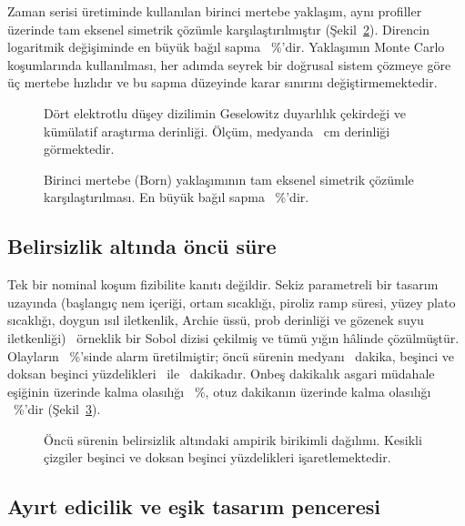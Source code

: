 \documentclass[11pt,a4paper]{article}
\begin{document}
Zaman serisi üretiminde kullanılan birinci mertebe yaklaşım, aynı profiller
üzerinde tam eksenel simetrik çözümle karşılaştırılmıştır
(Şekil~\ref{fig:born}). Direncin logaritmik değişiminde en büyük bağıl sapma
\bornErr~\%'dir. Yaklaşımın Monte Carlo koşumlarında kullanılması, her adımda
seyrek bir doğrusal sistem çözmeye göre üç mertebe hızlıdır ve bu sapma
düzeyinde karar sınırını değiştirmemektedir.

\begin{figure}[htbp]\centering

\caption{Dört elektrotlu düşey dizilimin Geselowitz duyarlılık çekirdeği ve
kümülatif araştırma derinliği. Ölçüm, medyanda \zMedian~cm derinliği
görmektedir.}
\label{fig:kernel}
\end{figure}

\begin{figure}[htbp]\centering

\caption{Birinci mertebe (Born) yaklaşımının tam eksenel simetrik çözümle
karşılaştırılması. En büyük bağıl sapma \bornErr~\%'dir.}
\label{fig:born}
\end{figure}

\subsection{Belirsizlik altında öncü süre}

Tek bir nominal koşum fizibilite kanıtı değildir. Sekiz parametreli bir
tasarım uzayında (başlangıç nem içeriği, ortam sıcaklığı, piroliz ramp süresi,
yüzey plato sıcaklığı, doygun ısıl iletkenlik, Archie üssü, prob derinliği ve
gözenek suyu iletkenliği) \mcPos\ örneklik bir Sobol dizisi çekilmiş ve tümü
yığın hâlinde çözülmüştür. Olayların \detRate~\%'sinde alarm üretilmiştir;
öncü sürenin medyanı \leadMed~dakika, beşinci ve doksan beşinci yüzdelikleri
\leadPfive\ ile \leadPnf~dakikadır. Onbeş dakikalık asgari müdahale eşiğinin
üzerinde kalma olasılığı \pLeadFifteen~\%, otuz dakikanın üzerinde kalma
olasılığı \pLeadThirty~\%'dir (Şekil~\ref{fig:leadcdf}).

\begin{figure}[htbp]\centering

\caption{Öncü sürenin belirsizlik altındaki ampirik birikimli dağılımı.
Kesikli çizgiler beşinci ve doksan beşinci yüzdelikleri işaretlemektedir.}
\label{fig:leadcdf}
\end{figure}

\subsection{Ayırt edicilik ve eşik tasarım penceresi}
\end{document}
